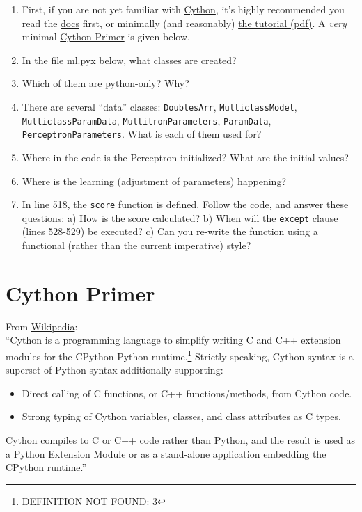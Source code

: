 \documentclass[11pt]{article}
\begin{document}
\begin{enumerate}
\item First, if you are not yet familiar with \href{http://cython.org}{Cython}, it's highly
      recommended you read the \href{http://docs.cython.org/}{docs} first, or minimally (and
      reasonably) \href{http://conference.scipy.org/proceedings/SciPy2009/paper_1/full_text.pdf}{the tutorial (pdf)}. A \emph{very} minimal \hyperref[sec-8]{Cython Primer} is given
      below.
\item In the file \hyperref[sec-9-2]{ml.pyx} below, what classes are created?
\item Which of them are python-only? Why?
\item There are several ``data'' classes: \texttt{DoublesArr},
      \texttt{MulticlassModel}, \texttt{MulticlassParamData}, \texttt{MultitronParameters},
      \texttt{ParamData}, \texttt{PerceptronParameters}. What is each of them used for?
\item Where in the code is the Perceptron initialized? What are the
      initial values?
\item Where is the learning (adjustment of parameters) happening?
\item In line 518, the \texttt{score} function is defined. Follow the code,
      and answer these questions:
      a) How is the score calculated?
      b) When will the \texttt{except} clause (lines 528-529) be executed?
      c) Can you re-write the function using a functional (rather than
      the current imperative) style?
\end{enumerate}



    
  
\section{\label{Cython-Primer}Cython Primer}
\label{sec-8}

    From \href{https://en.wikipedia.org/wiki/Cython}{Wikipedia}: \\
    ``Cython is a programming language to simplify writing C and C++
    extension modules for the CPython Python runtime.\footnote{DEFINITION NOT FOUND: 3 } Strictly
    speaking, Cython syntax is a superset of Python syntax
    additionally supporting: 
\begin{itemize}
\item Direct calling of C functions, or C++ functions/methods, from Cython code.
\item Strong typing of Cython variables, classes, and class attributes
      as C types.
\end{itemize}
    Cython compiles to C or C++ code rather than Python, and the
    result is used as a Python Extension Module or as a stand-alone
    application embedding the CPython runtime.''
\end{document}
